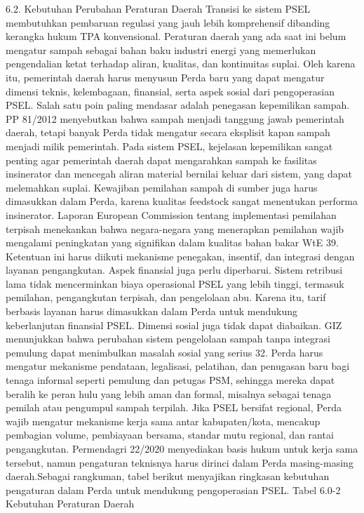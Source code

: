 \documentclass[
  letterpaper,
  DIV=11,
  numbers=noendperiod]{scrreprt}
\begin{document}
6.2. Kebutuhan Perubahan Peraturan Daerah Transisi ke sistem PSEL
membutuhkan pembaruan regulasi yang jauh lebih komprehensif dibanding
kerangka hukum TPA konvensional. Peraturan daerah yang ada saat ini
belum mengatur sampah sebagai bahan baku industri energi yang memerlukan
pengendalian ketat terhadap aliran, kualitas, dan kontinuitas suplai.
Oleh karena itu, pemerintah daerah harus menyusun Perda baru yang dapat
mengatur dimensi teknis, kelembagaan, finansial, serta aspek sosial dari
pengoperasian PSEL. Salah satu poin paling mendasar adalah penegasan
kepemilikan sampah. PP 81/2012 menyebutkan bahwa sampah menjadi tanggung
jawab pemerintah daerah, tetapi banyak Perda tidak mengatur secara
eksplisit kapan sampah menjadi milik pemerintah. Pada sistem PSEL,
kejelasan kepemilikan sangat penting agar pemerintah daerah dapat
mengarahkan sampah ke fasilitas insinerator dan mencegah aliran material
bernilai keluar dari sistem, yang dapat melemahkan suplai. Kewajiban
pemilahan sampah di sumber juga harus dimasukkan dalam Perda, karena
kualitas feedstock sangat menentukan performa insinerator. Laporan
European Commission tentang implementasi pemilahan terpisah menekankan
bahwa negara-negara yang menerapkan pemilahan wajib mengalami
peningkatan yang signifikan dalam kualitas bahan bakar WtE 39. Ketentuan
ini harus diikuti mekanisme penegakan, insentif, dan integrasi dengan
layanan pengangkutan. Aspek finansial juga perlu diperbarui. Sistem
retribusi lama tidak mencerminkan biaya operasional PSEL yang lebih
tinggi, termasuk pemilahan, pengangkutan terpisah, dan pengelolaan abu.
Karena itu, tarif berbasis layanan harus dimasukkan dalam Perda untuk
mendukung keberlanjutan finansial PSEL. Dimensi sosial juga tidak dapat
diabaikan. GIZ menunjukkan bahwa perubahan sistem pengelolaan sampah
tanpa integrasi pemulung dapat menimbulkan masalah sosial yang serius
32. Perda harus mengatur mekanisme pendataan, legalisasi, pelatihan, dan
penugasan baru bagi tenaga informal seperti pemulung dan petugas PSM,
sehingga mereka dapat beralih ke peran hulu yang lebih aman dan formal,
misalnya sebagai tenaga pemilah atau pengumpul sampah terpilah. Jika
PSEL bersifat regional, Perda wajib mengatur mekanisme kerja sama antar
kabupaten/kota, mencakup pembagian volume, pembiayaan bersama, standar
mutu regional, dan rantai pengangkutan. Permendagri 22/2020 menyediakan
basis hukum untuk kerja sama tersebut, namun pengaturan teknisnya harus
dirinci dalam Perda masing-masing daerah.Sebagai rangkuman, tabel
berikut menyajikan ringkasan kebutuhan pengaturan dalam Perda untuk
mendukung pengoperasian PSEL. Tabel 6.0-2 Kebutuhan Peraturan Daerah
\end{document}
